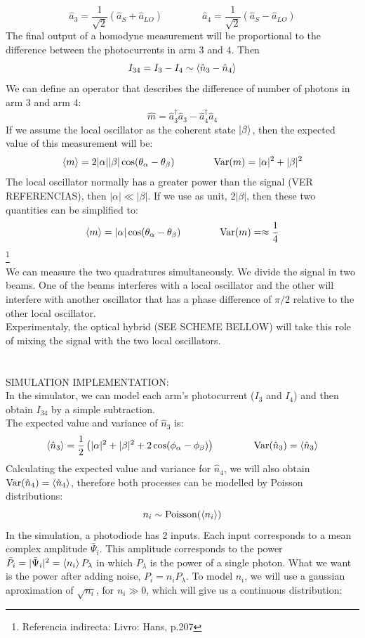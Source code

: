 $$
\hat{a}_3 = \frac{1}{\sqrt{2}} \left( \hat{a}_S + \hat{a}_{LO} \right)
\qquad
\qquad
\hat{a}_4 = \frac{1}{\sqrt{2}} \left( \hat{a}_S - \hat{a}_{LO} \right)
$$
The final output of a homodyne measurement will be proportional to the difference between the photocurrents in arm $3$ and $4$. Then
$$
I_{34} = I_3 - I_4 \sim \braket{\hat{n}_3 - \hat{n}_4}
$$
We can define an operator that describes the difference of number of photons in arm 3 and arm 4:
$$
\hat{m} = \hat{a}^\dagger_3\hat{a}_3 - \hat{a}^\dagger_4\hat{a}_4
$$
If we assume the local oscillator as the coherent state $\ket{\beta}$, then the expected value of this measurement will be:
$$
\braket{m} = 2|\alpha||\beta|\cos({\theta_\alpha - \theta_\beta})
\qquad
\qquad
\textrm{Var}(m) = |\alpha|^2 + |\beta|^2
$$
The local oscillator normally has a greater power than the signal (VER REFERENCIAS), then $|\alpha| \ll |\beta|$. If we use as unit, $2|\beta|$, then these two quantities can be simplified to:
$$
\braket{m} = |\alpha|\cos({\theta_\alpha - \theta_\beta})
\qquad
\qquad
\textrm{Var}(m) =  \approx \frac{1}{4}
$$
\footnote{Referencia indirecta: Livro: Hans, p.207}
\\
We can measure the two quadratures simultaneously. We divide the signal in two beams.
One of the beams interferes with a local oscillator and the other will interfere with another oscillator that has a phase difference of $\pi/2$ relative to the other local oscillator.\\
Experimentaly, the optical hybrid (SEE SCHEME BELLOW) will take this role of mixing the signal with the two local oscillators.\\
\\
\\
SIMULATION IMPLEMENTATION:\\
In the simulator, we can model each arm's photocurrent ($I_3$ and $I_4$) and then obtain $I_{34}$ by a simple subtraction.\\
The expected value and variance of $\hat{n}_3$ is:
$$
\braket{\hat{n}_3} = \frac{1}{2} \left( |\alpha|^2 + |\beta|^2 + 2 \cos(\phi_\alpha - \phi_\beta) \right)
\qquad
\qquad
\textrm{Var}(\hat{n}_3) = \braket{\hat{n}_3}
$$
Calculating the expected value and variance for $\hat{n}_4$, we will also obtain $\textrm{Var}(\hat{n}_4) = \braket{\hat{n}_4}$, therefore both processes can be modelled by Poisson distributions:
$$
n_i \sim \textrm{Poisson}(\braket{n_i})
$$
In the simulation, a photodiode has 2 inputs. Each input corresponds to a mean complex amplitude $\bar{\Psi}_i$. This amplitude corresponds to the power $\bar{P}_i = |\bar{\Psi}_i|^2 = \braket{n_i}P_\lambda$ in which $P_\lambda$ is the power of a single photon. What we want is the power after adding noise, $P_i = n_i P_\lambda$. To model $n_i$, we will use a gaussian aproximation of $\sqrt{n_i}$, for $n_i \gg 0$, which will give us a continuous distribution:
